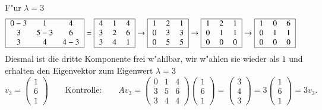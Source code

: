 F"ur $\lambda = 3$
\begin{align*}
\begin{tabular}{|>{$}c<{$}>{$}c<{$}>{$}c<{$}|}
\hline
0-3&1&4\\
3&5-3&6\\
3&4&4-3\\
\hline
\end{tabular}
&=
\begin{tabular}{|>{$}c<{$}>{$}c<{$}>{$}c<{$}|}
\hline
4&1&4\\
3&2&6\\
3&4&1\\
\hline
\end{tabular}
\rightarrow
\begin{tabular}{|>{$}c<{$}>{$}c<{$}>{$}c<{$}|}
\hline
1&2&1\\
0&3&3\\
0&5&5\\
\hline
\end{tabular}
\rightarrow
\begin{tabular}{|>{$}c<{$}>{$}c<{$}>{$}c<{$}|}
\hline
1&2&1\\
0&1&1\\
0&0&0\\
\hline
\end{tabular}
\rightarrow
\begin{tabular}{|>{$}c<{$}>{$}c<{$}>{$}c<{$}|}
\hline
1&0&6\\
0&1&1\\
0&0&0\\
\hline
\end{tabular}
\end{align*}
Diesmal ist die dritte Komponente frei w"ahlbar, wir w"ahlen sie wieder als
$1$ und erhalten den Eigenvektor zum Eigenwert $\lambda=3$
\[
v_3=\begin{pmatrix}1\\6\\1\end{pmatrix}
\qquad\text{Kontrolle:}\qquad
Av_3
=
\begin{pmatrix}
0&1&4\\
3&5&6\\
3&4&4
\end{pmatrix}
\begin{pmatrix}1\\6\\1\end{pmatrix}
=
\begin{pmatrix}3\\4\\3\end{pmatrix}
=
3\begin{pmatrix}1\\6\\1\end{pmatrix}
=
3v_3.
\]

